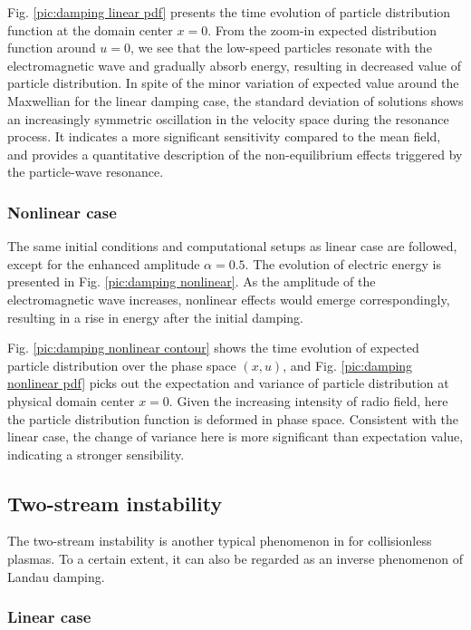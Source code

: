 \documentclass[preprint,3p,12pt,sort&compress]{elsarticle}
\begin{document}
Fig. \ref{pic:damping linear pdf} presents the time evolution of particle distribution function at the domain center $x=0$.
From the zoom-in expected distribution function around $u=0$, we see that the low-speed particles resonate with the electromagnetic wave and gradually absorb energy, resulting in decreased value of particle distribution.
In spite of the minor variation of expected value around the Maxwellian for the linear damping case, the standard deviation of solutions shows an increasingly symmetric oscillation in the velocity space during the resonance process.
It indicates a more significant sensitivity compared to the mean field, and
provides a quantitative description of the non-equilibrium effects triggered by the particle-wave resonance.

\subsubsection{Nonlinear case}

The same initial conditions and computational setups as linear case are followed, except for the enhanced amplitude $\alpha=0.5$. 
The evolution of electric energy is presented in Fig. \ref{pic:damping nonlinear}.
As the amplitude of the electromagnetic wave increases, nonlinear effects would emerge correspondingly, resulting in a rise in energy after the initial damping.

Fig. \ref{pic:damping nonlinear contour} shows the time evolution of expected particle distribution over the phase space $(x,u)$,
and Fig. \ref{pic:damping nonlinear pdf} picks out the expectation and variance of particle distribution at physical domain center $x=0$.
Given the increasing intensity of radio field, here the particle distribution function is deformed in phase space.
Consistent with the linear case, the change of variance here is more significant than expectation value, indicating a stronger sensibility.

\subsection{Two-stream instability}

The two-stream instability is another typical phenomenon in for collisionless plasmas. 
To a certain extent, it can also be regarded as an inverse phenomenon of Landau damping.

\subsubsection{Linear case}
\end{document}
